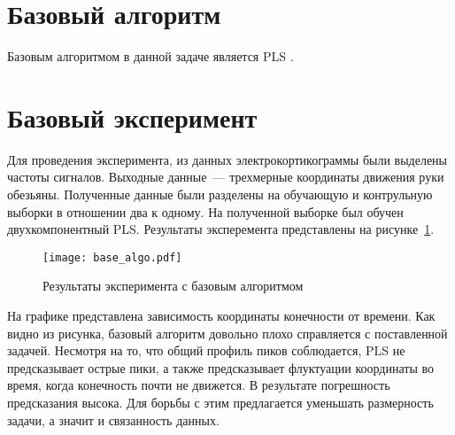 \section{Базовый алгоритм}
Базовым алгоритмом в данной задаче является PLS \cite{Haenlein2004}.

\section{Базовый эксперимент}
Для проведения эксперимента, из данных электрокортикограммы были выделены частоты сигналов. Выходные данные~--- трехмерные координаты движения руки обезьяны. Полученные данные были разделены на обучающую и контрульную выборки в отношении два к одному. На полученной выборке был обучен двухкомпонентный PLS. Результаты эксперемента представлены на рисунке~\ref{fig:baseAlgo}.
\begin{figure}
  \begin{center}
    \texttt{[image: base\_algo.pdf]}
    \caption{Результаты эксперимента с базовым алгоритмом}
    \label{fig:baseAlgo}
  \end{center}
\end{figure}
На графике представлена зависимость координаты конечности от времени. Как видно из рисунка, базовый алгоритм довольно плохо справляется с поставленной задачей. Несмотря на то, что общий профиль пиков соблюдается, PLS не предсказывает острые пики, а также предсказывает флуктуации координаты во время, когда конечность почти не движется. В результате погрешность предсказания высока. Для борьбы с этим предлагается уменьшать размерность задачи, а значит и связанность данных.

